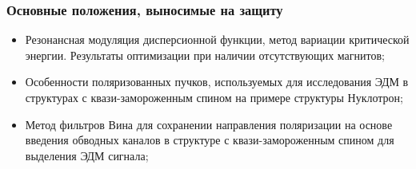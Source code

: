 \begin{frame}
	\frametitle{Основные положения, выносимые на защиту}
	\begin{itemize}
		\item	Резонансная модуляция дисперсионной функции, метод вариации критической энергии. Результаты оптимизации при наличии отсутствующих магнитов;
		\vspace{1em}
		\item	Особенности поляризованных пучков, используемых для исследования ЭДМ в структурах с квази-замороженным спином на примере структуры Нуклотрон;
		\vspace{1em}
		\item	Метод фильтров Вина для сохранении направления поляризации на основе введения обводных каналов в структуре с квази-замороженным спином для выделения ЭДМ сигнала;
	\end{itemize}
\end{frame}
